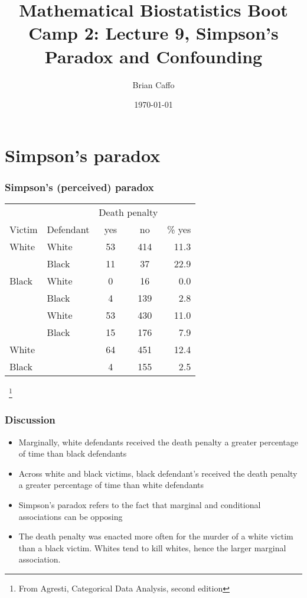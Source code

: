 \documentclass[aspectratio=169]{beamer}
\title{Mathematical Biostatistics Boot Camp 2: 
Lecture 9, Simpson's Paradox and Confounding}
\author{Brian Caffo}
\date{\today}
\institute[Department of Biostatistics]{
  Department of Biostatistics \\
  Johns Hopkins Bloomberg School of Public Health\\
  Johns Hopkins University
}
\begin{document}
\frame{\titlepage}


\section{Simpson's paradox}
\begin{frame}\frametitle{Simpson's (perceived) paradox}
\begin{center}
\ttfamily
  \begin{tabular}{llccr}
         &             & \multicolumn{2}{c}{Death penalty} &     \\ \cline{3-4}
Victim   & Defendant   &  yes  & no                        & \% yes \\ \hline
White & White & 53 & 414 & 11.3 \\
      & Black & 11 & 37  & 22.9 \\
Black & White & 0  & 16  &  0.0 \\
      & Black & 4  & 139 &  2.8 \\ \hline
      & White & 53 & 430 & 11.0 \\
      & Black & 15 & 176 &  7.9 \\ \hline
White &       & 64 & 451 & 12.4 \\
Black &       &  4 & 155 &  2.5 \\ \hline
  \end{tabular}
\normalfont
\end{center}
~\footnote{From Agresti, Categorical Data Analysis, second edition}
\end{frame}

\begin{frame}\frametitle{Discussion}
\begin{itemize}
\item Marginally, white defendants received the death penalty a greater percentage of 
  time than black defendants
\item Across white and black victims, black defendant's received the
  death penalty a greater percentage of time than white defendants
\item Simpson's paradox refers to the fact that marginal and conditional associations
  can be opposing
\item The death penalty was enacted more often for the murder of a white victim than
  a black victim. Whites tend to kill whites, hence the larger marginal association.
\end{itemize}
\end{frame}
\end{document}
